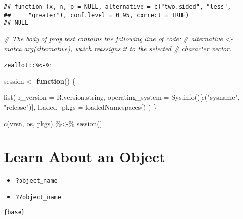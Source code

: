 \documentclass[
]{book}
\newenvironment{Shaded}{\begin{snugshade}}{\end{snugshade}}
\newcommand{\AttributeTok}[1]{\textcolor[rgb]{0.77,0.63,0.00}{#1}}
\newcommand{\CommentTok}[1]{\textcolor[rgb]{0.56,0.35,0.01}{\textit{#1}}}
\newcommand{\ControlFlowTok}[1]{\textcolor[rgb]{0.13,0.29,0.53}{\textbf{#1}}}
\newcommand{\FunctionTok}[1]{\textcolor[rgb]{0.00,0.00,0.00}{#1}}
\newcommand{\NormalTok}[1]{#1}
\newcommand{\OtherTok}[1]{\textcolor[rgb]{0.56,0.35,0.01}{#1}}
\newcommand{\SpecialCharTok}[1]{\textcolor[rgb]{0.00,0.00,0.00}{#1}}
\newcommand{\StringTok}[1]{\textcolor[rgb]{0.31,0.60,0.02}{#1}}
\providecommand{\tightlist}{%
  \setlength{\itemsep}{0pt}\setlength{\parskip}{0pt}}
\begin{document}
\begin{verbatim}
## function (x, n, p = NULL, alternative = c("two.sided", "less", 
##     "greater"), conf.level = 0.95, correct = TRUE) 
## NULL
\end{verbatim}

\begin{Shaded}
\begin{Highlighting}[]
\CommentTok{\# The body of \textasciigrave{}prop.test\textasciigrave{} contains the following line of code:}
\CommentTok{\# \textasciigrave{}alternative \textless{}{-} match.arg(alternative), which reassigns it to the selected}
\CommentTok{\# character vector.}
\end{Highlighting}
\end{Shaded}

\texttt{zeallot::\%\textless{}-\%}:

\begin{Shaded}
\begin{Highlighting}[]
\NormalTok{session }\OtherTok{\textless{}{-}} \ControlFlowTok{function}\NormalTok{() \{}
  
  \FunctionTok{list}\NormalTok{(}
    \AttributeTok{r\_version        =}\NormalTok{ R.version.string,}
    \AttributeTok{operating\_system =} \FunctionTok{Sys.info}\NormalTok{()[}\FunctionTok{c}\NormalTok{(}\StringTok{"sysname"}\NormalTok{, }\StringTok{"release"}\NormalTok{)],}
    \AttributeTok{loaded\_pkgs      =} \FunctionTok{loadedNamespaces}\NormalTok{()}
\NormalTok{  )}
\NormalTok{\}}

\FunctionTok{c}\NormalTok{(vrsn, os, pkgs) }\SpecialCharTok{\%\textless{}{-}\%} \FunctionTok{session}\NormalTok{() }
\end{Highlighting}
\end{Shaded}

\hypertarget{learn-about-an-object}{%
\section{Learn About an Object}\label{learn-about-an-object}}

\begin{itemize}
\tightlist
\item
  \texttt{?object\_name}
\item
  \texttt{??object\_name}
\end{itemize}

\texttt{\{base\}}
\end{document}
